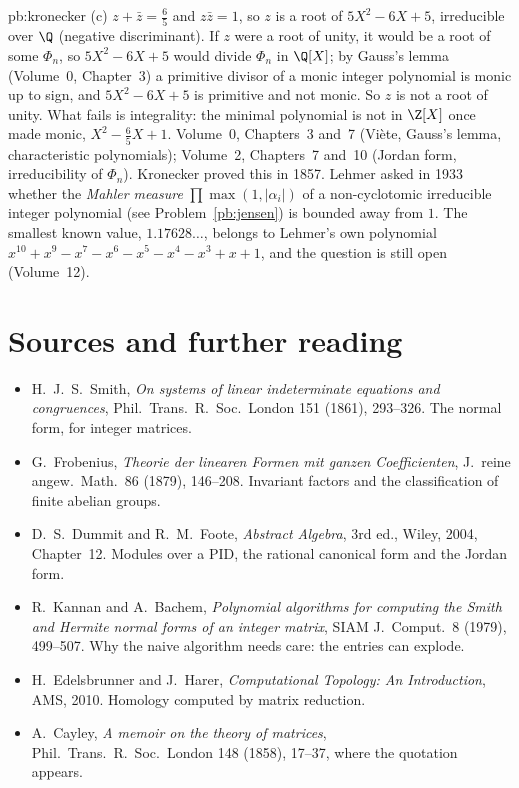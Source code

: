 \begin{solution}{pb:kronecker}
(c) $z+\bar z=\frac65$ and $z\bar z=1$, so $z$ is a root of $5X^2-6X+5$, irreducible over $\Q$ (negative discriminant).
If $z$ were a root of unity, it would be a root of some $\Phi_n$, so $5X^2-6X+5$ would divide $\Phi_n$ in $\Q[X]$; by Gauss's
lemma (Volume~0, Chapter~3) a primitive divisor of a monic integer polynomial is monic up to sign, and $5X^2-6X+5$ is
primitive and not monic. So $z$ is not a root of unity. What fails is integrality: the minimal polynomial is not in
$\Z[X]$ once made monic, $X^2-\frac65X+1$.
\tools Volume~0, Chapters~3 and~7 (Viète, Gauss's lemma, characteristic polynomials); Volume~2, Chapters~7 and~10 (Jordan form,
irreducibility of $\Phi_n$).
\leads Kronecker proved this in 1857. Lehmer asked in 1933 whether the \emph{Mahler measure} $\prod\max(1,|\alpha_i|)$ of a
non-cyclotomic irreducible integer polynomial (see Problem~\ref{pb:jensen}) is bounded away from $1$. The smallest known value,
$1.17628\ldots$, belongs to Lehmer's own polynomial $x^{10}+x^9-x^7-x^6-x^5-x^4-x^3+x+1$, and the question is still open
(Volume~12).
\end{solution}

\section*{Sources and further reading}

\begin{itemize}
\item H.~J.~S.~Smith, \emph{On systems of linear indeterminate equations and congruences}, Phil.\ Trans.\ R.\ Soc.\ London 151 (1861), 293--326. The normal form, for integer matrices.
\item G.~Frobenius, \emph{Theorie der linearen Formen mit ganzen Coefficienten}, J.\ reine angew.\ Math.\ 86 (1879), 146--208. Invariant factors and the classification of finite abelian groups.
\item D.~S.~Dummit and R.~M.~Foote, \emph{Abstract Algebra}, 3rd ed., Wiley, 2004, Chapter~12. Modules over a PID, the rational canonical form and the Jordan form.
\item R.~Kannan and A.~Bachem, \emph{Polynomial algorithms for computing the Smith and Hermite normal forms of an integer matrix}, SIAM J.\ Comput.\ 8 (1979), 499--507. Why the naive algorithm needs care: the entries can explode.
\item H.~Edelsbrunner and J.~Harer, \emph{Computational Topology: An Introduction}, AMS, 2010. Homology computed by matrix reduction.
\item A.~Cayley, \emph{A memoir on the theory of matrices}, Phil.\ Trans.\ R.\ Soc.\ London 148 (1858), 17--37, where the quotation appears.
\end{itemize}
